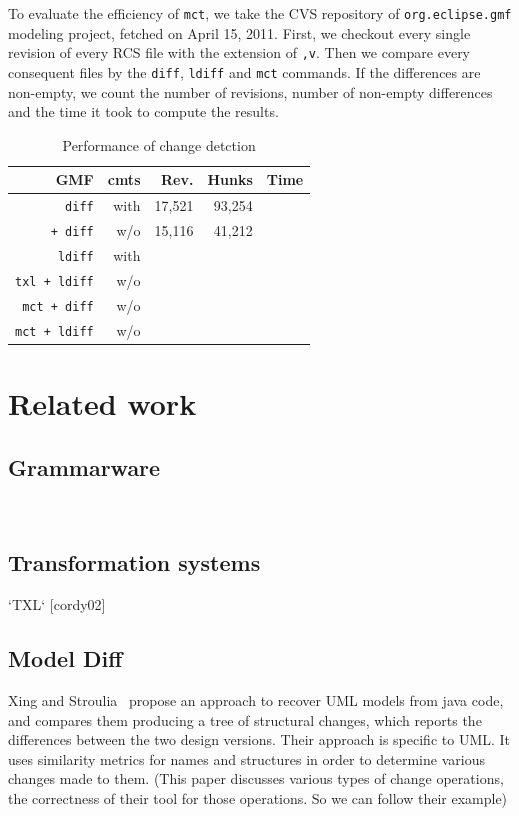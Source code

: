 \documentclass[10pt, conference, compsocconf]{IEEEtran}
\begin{document}
{%
To evaluate the efficiency of {\tt mct}, we take the CVS repository of {\tt org.eclipse.gmf} modeling project, fetched on April 15, 2011. First, we checkout every single revision of every RCS file with the extension of {\tt ,v}. Then we compare every consequent files by the {\tt diff}, {\tt ldiff} and {\tt mct} commands. If the differences are non-empty, we count the number of revisions,  number of non-empty differences and the time it took to compute the results.
\begin{table}\centering
\caption{Performance of change detction\label{table:2}}
\begin{tabular}{| r || r | r | r | r ||}\hline
{\bf GMF} &  {\bf cmts} & {\bf Rev.} & {\bf Hunks} & {\bf Time} \\\hline\hline
{\tt diff} & with & 17,521 & 93,254 & \\\hline
{\tt   + diff} & w/o & 15,116 & 41,212 & \\\hline
{\tt ldiff} & with &  & & \\\hline
{\tt txl + ldiff} & w/o  &  & & \\\hline
{\tt mct + diff} &w/o  & & & \\\hline
{\tt mct + ldiff} &w/o  & & & \\\hline
\hline\end{tabular}
\end{table}

\section{Related work}\label{sec:related}
\subsection{Grammarware}
 
~\cite{klint05tosem}
   
\subsection{Transformation systems}

   `TXL` [cordy02]
   
\subsection{Model Diff}
Xing and Stroulia~\cite{xing05ase} propose an approach to recover UML models from java code, and compares them producing a tree of structural changes, which reports the differences between the
two design versions.  Their approach is specific to UML. It uses similarity metrics for names and structures in order to determine various changes made to them. (This paper discusses various types of change operations, the correctness of their tool for those operations. So we can follow their example)

}
\end{document}
